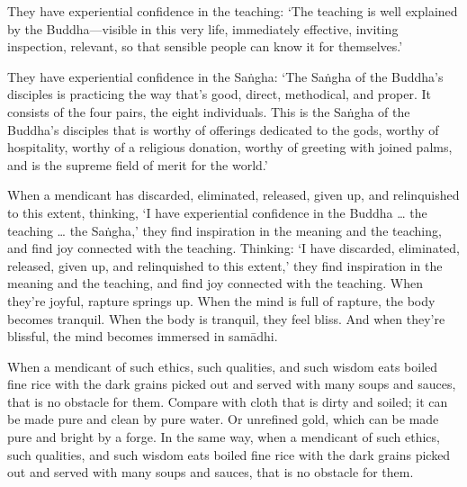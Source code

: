 \documentclass[12pt,openany]{book}%
\begin{document}
They have experiential confidence in the teaching: ‘The teaching is well explained by the Buddha—visible in this very life, immediately effective, inviting inspection, relevant, so that sensible people can know it for themselves.’ 

They have experiential confidence in the \textsanskrit{Saṅgha}: ‘The \textsanskrit{Saṅgha} of the Buddha’s disciples is practicing the way that’s good, direct, methodical, and proper. It consists of the four pairs, the eight individuals. This is the \textsanskrit{Saṅgha} of the Buddha’s disciples that is worthy of offerings dedicated to the gods, worthy of hospitality, worthy of a religious donation, worthy of greeting with joined palms, and is the supreme field of merit for the world.’ 

When a mendicant has discarded, eliminated, released, given up, and relinquished to this extent, thinking, ‘I have experiential confidence in the Buddha … the teaching … the \textsanskrit{Saṅgha},’ they find inspiration in the meaning and the teaching, and find joy connected with the teaching. Thinking: ‘I have discarded, eliminated, released, given up, and relinquished to this extent,’ they find inspiration in the meaning and the teaching, and find joy connected with the teaching. When they’re joyful, rapture springs up. When the mind is full of rapture, the body becomes tranquil. When the body is tranquil, they feel bliss. And when they’re blissful, the mind becomes immersed in \textsanskrit{samādhi}. 

When a mendicant of such ethics, such qualities, and such wisdom eats boiled fine rice with the dark grains picked out and served with many soups and sauces, that is no obstacle for them. Compare with cloth that is dirty and soiled; it can be made pure and clean by pure water. Or unrefined gold, which can be made pure and bright by a forge. In the same way, when a mendicant of such ethics, such qualities, and such wisdom eats boiled fine rice with the dark grains picked out and served with many soups and sauces, that is no obstacle for them. 
\end{document}
